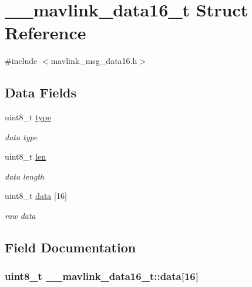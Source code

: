 \hypertarget{struct____mavlink__data16__t}{\section{\+\_\+\+\_\+mavlink\+\_\+data16\+\_\+t Struct Reference}
\label{struct____mavlink__data16__t}
}


{\ttfamily \#include $<$mavlink\+\_\+msg\+\_\+data16.\+h$>$}

\subsection*{Data Fields}
\begin{DoxyCompactItemize}
\item 
uint8\+\_\+t \hyperlink{struct____mavlink__data16__t_add5872e4917638939b99c745df4ce051}{type}
\begin{DoxyCompactList}\small\item\em data type \end{DoxyCompactList}\item 
uint8\+\_\+t \hyperlink{struct____mavlink__data16__t_a0e76a775ee751058f04d45e32a53531a}{len}
\begin{DoxyCompactList}\small\item\em data length \end{DoxyCompactList}\item 
uint8\+\_\+t \hyperlink{struct____mavlink__data16__t_a7cc1b54dc59215e9ea7b061c622cd6cb}{data} \mbox{[}16\mbox{]}
\begin{DoxyCompactList}\small\item\em raw data \end{DoxyCompactList}\end{DoxyCompactItemize}


\subsection{Field Documentation}
\hypertarget{struct____mavlink__data16__t_a7cc1b54dc59215e9ea7b061c622cd6cb}{
\subsubsection[{data}]{\setlength{\rightskip}{0pt plus 5cm}uint8\+\_\+t \+\_\+\+\_\+mavlink\+\_\+data16\+\_\+t\+::data\mbox{[}16\mbox{]}}}\label{struct____mavlink__data16__t_a7cc1b54dc59215e9ea7b061c622cd6cb}


